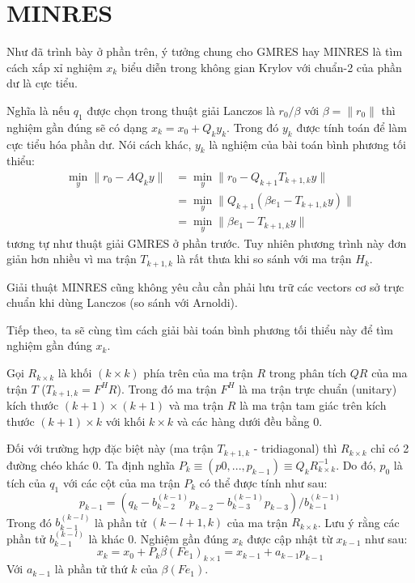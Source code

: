 \section{MINRES}
Như đã trình bày ở phần trên, ý tưởng chung cho GMRES hay MINRES là tìm cách xấp
xỉ nghiệm $x_k$ biểu diễn trong không gian Krylov với chuẩn-2 của phần dư là cực tiểu.

Nghĩa là nếu $q_1$ được chọn trong thuật giải Lanczos là $r_0/\beta$ với 
$\beta = \|r_0\|$ thì nghiệm gần đúng sẽ có dạng $x_k = x_0 + Q_ky_k$. Trong đó
$y_k$ được tính toán để làm cực tiểu hóa phần dư. Nói cách khác, $y_k$ là nghiệm
của bài toán bình phương tối thiểu:
\begin{equation}
    \begin{split}
        \min_y \|r_0 - AQ_ky\| &= \min_y \|r_0 - Q_{k+1}T_{k+1, k}y\| \\
        &= \min_y \|Q_{k+1}(\beta e_1 - T_{k+1,k}y)\| \\
        &= \min_y \|\beta e_1 - T_{k+1,k}y\|
    \end{split}
\end{equation}
tương tự như thuật giải GMRES ở phần trước. Tuy nhiên phương trình này đơn giản hơn nhiều 
vì ma trận $T_{k+1,k}$ là rất thưa khi so sánh với ma trận $H_k$.

Giải thuật MINRES cũng không yêu cầu cần phải lưu trữ các vectors cơ sở trực chuẩn 
khi dùng Lanczos (so sánh với Arnoldi). 

Tiếp theo, ta sẽ cùng tìm cách giải bài toán bình phương tối thiểu này để tìm nghiệm 
gần đúng $x_k$.

Gọi $R_{k \times k}$ là khối $(k \times k)$ phía trên của ma trận $R$ trong phân tích $QR$
của ma trận $T$ ($T_{k+1, k} = F^HR$). Trong đó ma trận $F^H$ là ma trận trực chuẩn (unitary)
kích thước $(k+1) \times (k+1)$ và ma trận $R$ là ma trận tam giác trên kích thước $(k+1) \times k$
với khối $k \times k$ và các hàng dưới đều bằng $0$.

Đối với trường hợp đặc biệt này (ma trận $T_{k+1,k}$ - tridiagonal) thì $R_{k \times k}$ chỉ có 2 đường chéo khác $0$.
Ta định nghĩa $P_k \equiv (p0, ..., p_{k-1}) \equiv Q_kR_{k \times k}^{-1}$. 
Do đó, $p_0$ là tích của $q_1$ với các cột của ma trận $P_k$ có thể được tính như sau:
\begin{equation}
    p_{k-1} = \left(q_k - b_{k-2}^{(k-1)} p_{k-2} - b_{k-3}^{(k-1)} p_{k-3}\right) / b_{k-1}^{(k-1)}
\end{equation}
Trong đó $b_{k-1}^{(k-l)}$ là phần tử $(k-l+1,k)$ của ma trận $R_{k \times k}$. Lưu ý rằng các phần tử
$b_{k-1}^{(k-l)}$ là khác $0$. Nghiệm gần đúng $x_k$ được cập nhật từ $x_{k-1}$ như sau:
\begin{equation}
    x_k = x_0 + P_k \beta (Fe_1)_{k \times 1} = x_{k-1} + a_{k-1}p_{k-1}
\end{equation}
Với $a_{k-1}$ là phần tử thứ $k$ của $\beta (Fe_1)$.
